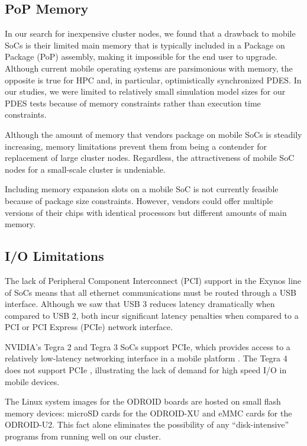 \documentclass[11pt]{book}
\begin{document}
\subsection{\textbf{PoP Memory}}

In our search for inexpensive cluster nodes, we found that a drawback to mobile
SoCs is their limited main memory that is typically included in a Package on
Package (PoP) assembly, making it impossible for the end user to
upgrade. Although current mobile operating systems are parsimonious with memory,
the opposite is true for HPC and, in particular, optimistically synchronized
PDES. In our studies, we were limited to relatively small simulation model sizes
for our PDES tests because of memory constraints rather than execution time
constraints.

Although the amount of memory that vendors package on mobile SoCs is steadily
increasing, memory limitations prevent them from being a contender for
replacement of large cluster nodes. Regardless, the attractiveness of mobile SoC
nodes for a small-scale cluster is undeniable.

Including memory expansion slots on a mobile SoC is not currently feasible
because of package size constraints. However, vendors could offer multiple
versions of their chips with identical processors but different amounts of main
memory.

\subsection{\textbf{I/O Limitations}}

The lack of Peripheral Component Interconnect (PCI) support in the Exynos line
of SoCs means that all ethernet communications must be routed through a USB
interface. Although we saw that USB 3 reduces latency dramatically when compared
to USB 2, both incur significant latency penalties when compared to a PCI or PCI
Express (PCIe) network interface.

NVIDIA's Tegra 2 and Tegra 3 SoCs support PCIe, which provides access to a
relatively low-latency networking interface in a mobile platform
\cite{rajovic-13}. The Tegra 4 does not support PCIe \cite{arstch-tegra},
illustrating the lack of demand for high speed I/O in mobile devices.

The Linux system images for the ODROID boards are hosted on small flash memory
devices: microSD cards for the ODROID-XU and eMMC cards for the ODROID-U2. This
fact alone eliminates the possibility of any ``disk-intensive'' programs from
running well on our cluster.
\end{document}
